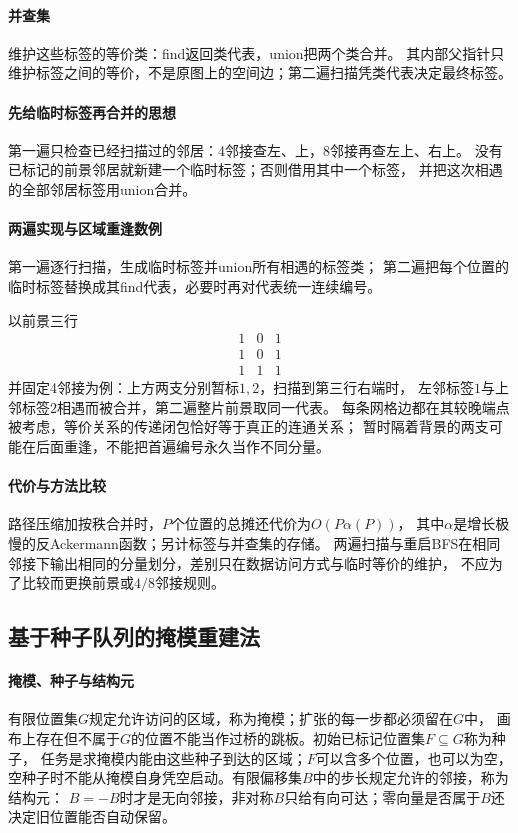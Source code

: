 \paragraph{并查集}
维护这些标签的等价类：find返回类代表，union把两个类合并。
其内部父指针只维护标签之间的等价，不是原图上的空间边；第二遍扫描凭类代表决定最终标签。

\paragraph{先给临时标签再合并的思想}
第一遍只检查已经扫描过的邻居：4邻接查左、上，8邻接再查左上、右上。
没有已标记的前景邻居就新建一个临时标签；否则借用其中一个标签，
并把这次相遇的全部邻居标签用union合并。

\paragraph{两遍实现与区域重逢数例}
\begin{algorithm}[两遍扫描标记]
  第一遍逐行扫描，生成临时标签并union所有相遇的标签类；
  第二遍把每个位置的临时标签替换成其find代表，必要时再对代表统一连续编号。
\end{algorithm}
以前景三行
\[
  \begin{matrix}1&0&1\\1&0&1\\1&1&1\end{matrix}
\]
并固定4邻接为例：上方两支分别暂标$1,2$，扫描到第三行右端时，
左邻标签$1$与上邻标签$2$相遇而被合并，第二遍整片前景取同一代表。
每条网格边都在其较晚端点被考虑，等价关系的传递闭包恰好等于真正的连通关系；
暂时隔着背景的两支可能在后面重逢，不能把首遍编号永久当作不同分量。

\paragraph{代价与方法比较}
路径压缩加按秩合并时，$P$个位置的总摊还代价为$O(P\alpha(P))$，
其中$\alpha$是增长极慢的反Ackermann函数；另计标签与并查集的存储。
两遍扫描与重启BFS在相同邻接下输出相同的分量划分，差别只在数据访问方式与临时等价的维护，
不应为了比较而更换前景或$4/8$邻接规则。

\subsection{基于种子队列的掩模重建法}

\paragraph{掩模、种子与结构元}
有限位置集$G$规定允许访问的区域，称为掩模；扩张的每一步都必须留在$G$中，
画布上存在但不属于$G$的位置不能当作过桥的跳板。初始已标记位置集$F\subseteq G$称为种子，
任务是求掩模内能由这些种子到达的区域；$F$可以含多个位置，也可以为空，
空种子时不能从掩模自身凭空启动。有限偏移集$B$中的步长规定允许的邻接，称为结构元：
$B=-B$时才是无向邻接，非对称$B$只给有向可达；零向量是否属于$B$还决定旧位置能否自动保留。

